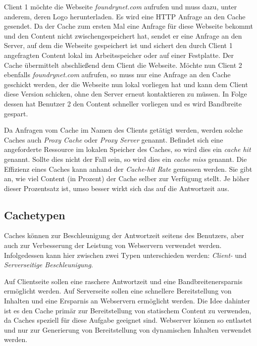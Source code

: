 Client 1 möchte die Webseite \textit{foundrynet.com} aufrufen und muss dazu, unter anderem, deren Logo herunterladen.
Es wird eine HTTP Anfrage an den Cache gesendet.
Da der Cache zum ersten Mal eine Anfrage für diese Webseite bekommt und den Content nicht zwischengespeichert hat, sendet er eine Anfrage an den Server, auf dem die Webseite gespeichert ist und sichert den durch Client 1 angefragten Content lokal im Arbeitsspeicher oder auf einer Festplatte.
Der Cache übermittelt abschließend dem Client die Webseite.
Möchte nun Client 2 ebenfalls \textit{foundrynet.com} aufrufen, so muss nur eine Anfrage an den Cache geschickt werden, der die Webseite nun lokal vorliegen hat und kann dem Client diese Version schicken, ohne den Server erneut kontaktieren zu müssen.
In Folge dessen hat Benutzer 2 den Content schneller vorliegen und es wird Bandbreite gespart. \cite{LoadBalancing2}

Da Anfragen vom Cache im Namen des Clients getätigt werden, werden solche Caches auch \textit{Proxy Cache} oder \textit{Proxy Server} genannt.
Befindet sich eine angeforderte Ressource im lokalen Speicher des Caches, so wird dies ein \textit{cache hit} genannt. Sollte dies nicht der Fall sein, so wird dies ein \textit{cache miss} genannt.
Die Effizienz eines Caches kann anhand der \textit{Cache-hit Rate} gemessen werden. Sie gibt an, wie viel Content (in Prozent) der Cache selber zur Verfügung stellt. Je höher dieser Prozentsatz ist, umso besser wirkt sich das auf die Antwortzeit aus.
\cite{LoadBalancing2}

\subsection{Cachetypen}
\label{sec:Cachetypen}
Caches können zur Beschleunigung der Antwortzeit seitens des Benutzers, aber auch zur Verbesserung der Leistung von Webservern verwendet werden. Infolgedessen kann hier zwischen zwei Typen unterschieden werden: \textit{Client-} und \textit{Serverseitige Beschleunigung}.

Auf Clientseite sollen eine raschere Antwortzeit und eine Bandbreitenersparnis ermöglicht werden. Auf Serverseite sollen eine schnellere Bereitstellung von Inhalten und eine Ersparnis an Webservern ermöglicht werden. Die Idee dahinter ist es den Cache primär zur Bereitstellung von statischem Content zu verwenden, da Caches speziell für diese Aufgabe geeignet sind. Webserver können so entlastet und nur zur Generierung von Bereitstellung von dynamischen Inhalten verwendet werden. \cite{LoadBalancing2}

